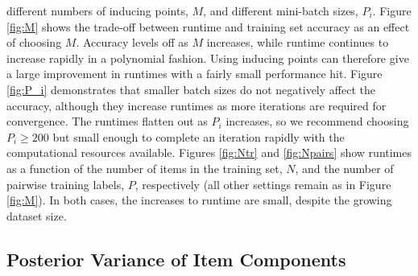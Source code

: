 different numbers of inducing points, $M$,
and different mini-batch sizes, $P_i$.
Figure \ref{fig:M} shows the trade-off between
runtime and training set accuracy as an effect of choosing $M$. 
Accuracy levels off as $M$ increases,
while runtime continues to increase rapidly in a polynomial fashion.
Using inducing points can therefore give a large improvement in runtimes 
with a fairly small performance hit.
Figure \ref{fig:P_i} demonstrates that
smaller batch sizes do not negatively affect the accuracy,
although they increase runtimes as more iterations are required for convergence.
The runtimes flatten out as $P_i$ increases, so we recommend choosing $P_i\geq 200$
but small enough to complete an iteration rapidly with the computational resources available.
Figures \ref{fig:Ntr} and \ref{fig:Npairs} show runtimes as a
function of the number of items in the training set, $N$,
and the number of pairwise training labels, $P$, respectively (all other settings remain as in Figure \ref{fig:M}).
In both cases, the increases to runtime are small, despite the growing dataset size.

\subsection{Posterior Variance of Item Components}
\label{sec:components}

